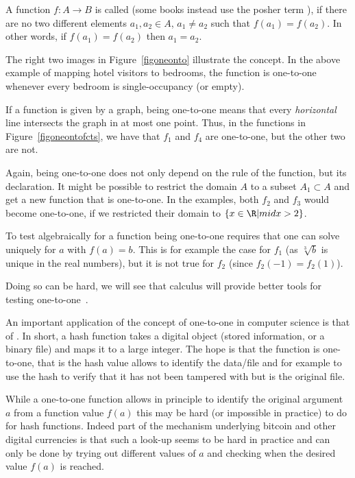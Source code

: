 \begin{defn}
A function $f\colon A\to B$ is called  (some books instead use the posher
term ), if there are no two different elements $a_1,a_2\in A$,
$a_1\not=a_2$ such that $f(a_1)=f(a_2)$. In other words, if $f(a_1)=f(a_2)$ then
$a_1=a_2$.
\end{defn}

The right two images in Figure~\ref{figoneonto} illustrate the concept.
In the above example of mapping hotel visitors to bedrooms, the function is one-to-one
whenever every bedroom is single-occupancy (or empty).
\medskip

If a function is given by a graph, being one-to-one means that every {\em horizontal}
line intersects the graph in at most one point. Thus,
in the functions in Figure~\ref{figoneontofcts}, we have that $f_1$ and $f_4$ are
one-to-one, but the other two are not.

Again, being one-to-one does not only depend on the rule of the function, but its
declaration. It might be possible to restrict the domain $A$ to a subset $A_1\subset A$
and get a new function that is one-to-one. In the examples, both $f_2$ and $f_3$ would
become one-to-one, if we restricted their domain to $\{x\in\R|mid x>2\}$.
\medskip

To test algebraically for a function being one-to-one requires that one can solve
uniquely for $a$ with $f(a)=b$. This is for example the case for $f_1$ (as
$\sqrt[3]{b}$ is unique in the real numbers), but it is not true for $f_2$ (since
$f_2(-1)=f_2(1)$).

Doing so can be hard, we will see that calculus will provide better tools
for testing one-to-one~.

An important application of the concept of one-to-one in computer science is
that of . In short, a hash function takes a digital
object (stored information, or a binary file) and maps it to a large
integer. The hope is that the function is one-to-one, that is the hash value allows to
identify the data/file and for example to use the hash to verify that it has
not been tampered with but is the original file.

While a one-to-one function allows in principle to identify the original
argument $a$ from a function value $f(a)$ this may be hard (or impossible in
practice) to do for hash functions. Indeed part of the mechanism underlying
bitcoin and other digital currencies is that such a look-up seems to be hard
in practice and can only be done by trying out different values of $a$ and
checking when the desired value $f(a)$ is reached.
\medskip

